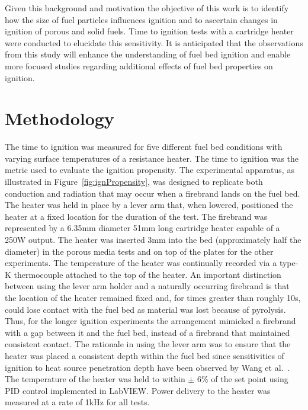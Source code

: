     Given this background and motivation the objective of this work is to identify how the size of fuel particles influences ignition and to ascertain changes in ignition of porous and solid fuels. Time to ignition tests with a cartridge heater were conducted to elucidate this sensitivity. It is anticipated that the observations from this study will enhance the understanding of fuel bed ignition and enable more focused studies regarding additional effects of fuel bed properties on ignition. 
  
 
\section*{Methodology}
   The time to ignition was measured for five different fuel bed conditions with varying surface temperatures of a resistance heater.  The time to ignition was the metric used to evaluate the ignition propensity. The experimental apparatus, as illustrated in Figure~\ref{fig:ignPropensity}, was designed to replicate both conduction and radiation that may occur when a firebrand lands on the fuel bed. The heater was held in place by a lever arm that, when lowered, positioned the heater at a fixed location for the duration of the test. The firebrand was represented by a 6.35\si{\milli\meter} diameter 51\si{\milli\meter} long cartridge heater capable of a 250\si{\watt} output. The heater was inserted 3\si{\milli\meter} into the bed (approximately half the diameter) in the porous media tests and on top of the plates for the other experiments. The temperature of the heater was continually recorded via a type-K thermocouple attached to the top of the heater. An important distinction between using the lever arm holder and a naturally occurring firebrand is that the location of the heater remained fixed and, for times greater than roughly 10\si{\second}, could lose contact with the fuel bed as material was lost because of pyrolysis.  Thus, for the longer ignition experiments the arrangement mimicked a firebrand with a gap between it and the fuel bed, instead of a firebrand that maintained consistent contact. The rationale in using the lever arm was to ensure that the heater was placed a consistent depth within the fuel bed since sensitivities of ignition to heat source penetration depth have been observed by Wang et al.~\cite{Wang2016}. The temperature of the heater was held to within $\pm$ 6\% of the set point using PID control implemented in LabVIEW. Power delivery to the heater was measured at a rate of 1kHz for all tests. 
